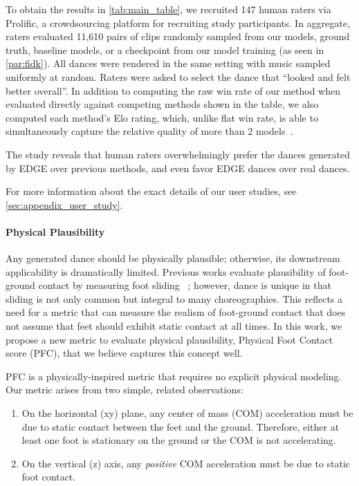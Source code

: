\documentclass[10pt,twocolumn,letterpaper]{article}
\begin{document}
To obtain the results in \cref{tab:main_table}, we recruited 147 human raters via Prolific, a crowdsourcing platform for recruiting study participants.
In aggregate, raters evaluated 11,610 pairs of clips randomly sampled from our models, ground truth, baseline models, or a checkpoint from our model training (as seen in \cref{par:fidk}).
All dances were rendered in the same setting with music sampled uniformly at random.
Raters were asked to select the dance that ``looked and felt better overall''.
In addition to computing the raw win rate of our method when evaluated directly against competing methods shown in the table, we also computed each method's Elo rating, which, unlike flat win rate, is able to simultaneously capture the relative quality of more than 2 models~\cite{elo1978rating}.

The study reveals that human raters overwhelmingly prefer the dances generated by EDGE over previous methods, and  even favor EDGE dances over real dances.

For more information about the exact details of our user studies, see \cref{sec:appendix_user_study}.

\paragraph{Physical Plausibility}
\label{par:exp_physical_plausibility}

Any generated dance should be physically plausible; otherwise, its downstream applicability is dramatically limited.
Previous works evaluate plausibility of foot-ground contact by measuring foot sliding ~\cite{taheri2022goal, he2022nemf}; however, dance is unique in that sliding is not only common but integral to many choreographies.
This reflects a need for a metric that can measure the realism of foot-ground contact that does not assume that feet should exhibit static contact at all times.
In this work, we propose a new metric to evaluate physical plausibility, Physical Foot Contact score (PFC), that we believe captures this concept well.

PFC is a physically-inspired metric that requires no explicit physical modeling.
Our metric arises from two simple, related observations:
\begin{enumerate}[itemsep=0ex,partopsep=0ex,parsep=0ex]
    \item On the horizontal (xy) plane, any center of mass (COM) acceleration must be due to static contact between the feet and the ground.
    Therefore, either at least one foot is stationary on the ground or the COM is not accelerating.
    \item On the vertical (z) axis, any \textit{positive} COM acceleration must be due to static foot contact.
\end{enumerate}
\end{document}
